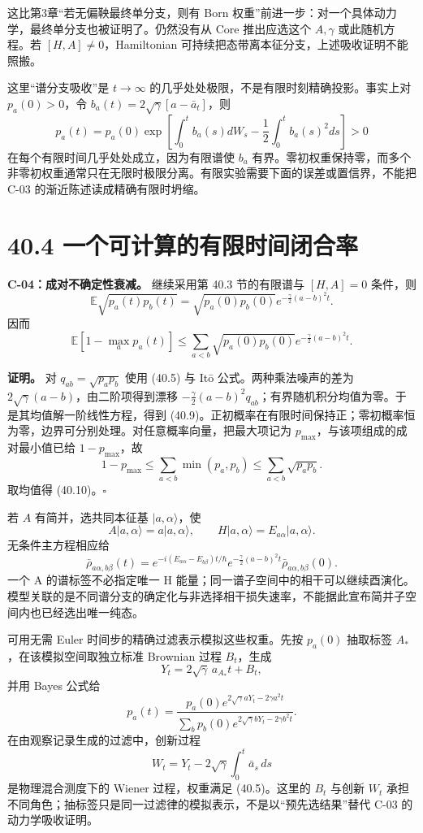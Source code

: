 \documentclass[
  11pt,
  oneside]{book}
\begin{document}
这比第3章``若无偏鞅最终单分支，则有 Born
权重''前进一步：对一个具体动力学，最终单分支也被证明了。仍然没有从 Core
推出应选这个 \(A,\gamma\) 或此随机方程。若 \([H,A]\ne0\)，Hamiltonian
可持续把态带离本征分支，上述吸收证明不能照搬。

这里``谱分支吸收''是 \(t\to\infty\)
的几乎处处极限，不是有限时刻精确投影。事实上对 \(p_a(0)>0\)，令
\(b_a(t)=2\sqrt\gamma[a-\bar a_t]\)，则 \[
p_a(t)=p_a(0)\exp\left[
\int_0^t b_a(s)dW_s-\frac12\int_0^t b_a(s)^2ds\right]>0
\] 在每个有限时间几乎处处成立，因为有限谱使 \(b_a\)
有界。零初权重保持零，而多个非零初权重通常只在无限时极限分离。有限实验需要下面的误差或置信界，不能把
C-03 的渐近陈述读成精确有限时坍缩。

\hypertarget{ux4e00ux4e2aux53efux8ba1ux7b97ux7684ux6709ux9650ux65f6ux95f4ux95edux5408ux7387}{%
\section{40.4
一个可计算的有限时间闭合率}\label{ux4e00ux4e2aux53efux8ba1ux7b97ux7684ux6709ux9650ux65f6ux95f4ux95edux5408ux7387}}

\protect\hypertarget{c-04}{}{}

\textbf{C-04：成对不确定性衰减。} 继续采用第 40.3 节的有限谱与
\([H,A]=0\) 条件，则 \[
\mathbb E\sqrt{p_a(t)p_b(t)}
=\sqrt{p_a(0)p_b(0)}
 e^{-\frac\gamma2(a-b)^2t}.
\tag{40.9}
\] 因而 \[
\mathbb E[1-\max_a p_a(t)]
\le\sum_{a<b}\sqrt{p_a(0)p_b(0)}
 e^{-\frac\gamma2(a-b)^2t}.
\tag{40.10}
\]

\textbf{证明。} 对 \(q_{ab}=\sqrt{p_ap_b}\) 使用 (40.5) 与 Itō
公式。两种乘法噪声的差为 \(2\sqrt\gamma(a-b)\)，由二阶项得到漂移
\(-\frac\gamma2(a-b)^2q_{ab}\)；有界随机积分均值为零。于是其均值解一阶线性方程，得到
(40.9)。正初概率在有限时间保持正；零初概率恒为零，边界可分别处理。对任意概率向量，把最大项记为
\(p_{\max}\)，与该项组成的成对最小值已给 \(1-p_{\max}\)，故 \[
1-p_{\max}\le\sum_{a<b}\min(p_a,p_b)
\le\sum_{a<b}\sqrt{p_ap_b}.
\] 取均值得 (40.10)。\(\square\)

若 \(A\) 有简并，选共同本征基 \(|a,\alpha\rangle\)，使 \[
A|a,\alpha\rangle=a|a,\alpha\rangle,
\qquad H|a,\alpha\rangle=E_{a\alpha}|a,\alpha\rangle.
\] 无条件主方程相应给 \[
\bar\rho_{a\alpha,b\beta}(t)=
 e^{-i(E_{a\alpha}-E_{b\beta})t/\hbar}
 e^{-\frac\gamma2(a-b)^2t}
\bar\rho_{a\alpha,b\beta}(0).
\] 一个 A 的谱标签不必指定唯一 H
能量；同一谱子空间中的相干可以继续酉演化。模型关联的是不同谱分支的确定化与非选择相干损失速率，不能据此宣布简并子空间内也已经选出唯一纯态。

可用无需 Euler 时间步的精确过滤表示模拟这些权重。先按 \(p_a(0)\)
抽取标签 \(A_*\)，在该模拟空间取独立标准 Brownian 过程 \(B_t\)，生成 \[
Y_t=2\sqrt\gamma\,a_{A_*}t+B_t,
\] 并用 Bayes 公式给 \[
p_a(t)=
\frac{p_a(0)e^{2\sqrt\gamma aY_t-2\gamma a^2t}}
{\sum_b p_b(0)e^{2\sqrt\gamma bY_t-2\gamma b^2t}}.
\tag{40.11}
\] 在由观察记录生成的过滤中，创新过程 \[
W_t=Y_t-2\sqrt\gamma\int_0^t\bar a_s\,ds
\] 是物理混合测度下的 Wiener 过程，权重满足 (40.5)。这里的 \(B_t\)
与创新 \(W_t\)
承担不同角色；抽标签只是同一过滤律的模拟表示，不是以``预先选结果''替代
C-03 的动力学吸收证明。
\end{document}
